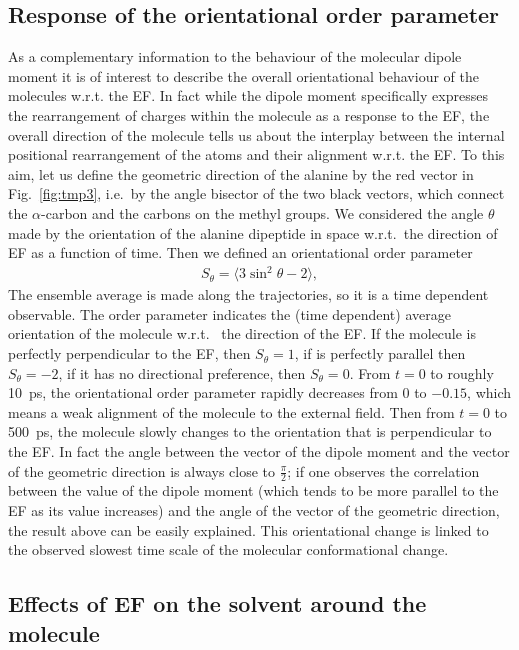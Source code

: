 \documentclass[a4paper,preprint,unsortedaddress,onecolumn]{revtex4-1}
\newcommand{\recheck}[1]{{\color{red} #1}}
\begin{document}
\subsection{Response of the orientational order parameter}
\recheck{As a complementary information to the behaviour of the molecular dipole moment it is of interest to describe the overall orientational behaviour of the molecules w.r.t. the EF. In fact while the dipole moment specifically expresses the rearrangement of charges within the molecule as a response to the EF, the overall direction of the molecule tells us about the interplay between the internal positional rearrangement of the atoms and their alignment w.r.t. the EF.   
To this aim,} let us define
the geometric direction of the alanine by the red vector in
Fig.~\ref{fig:tmp3}, i.e.~by the angle bisector of the two black vectors,
which connect the $\alpha$-carbon and the carbons
on the methyl groups. 
We considered the angle $\theta$ made by 
the orientation of the alanine dipeptide in space w.r.t.~the direction of EF
as a function of time.
Then we defined an orientational order parameter 
\begin{align}
  S_\theta = \langle 3\sin^2\theta - 2\rangle,
\end{align}
\recheck{The ensemble average is made along the trajectories, so it is
a time dependent observable.
The order parameter
indicates the (time dependent) average orientation of the molecule w.r.t. ~the direction of the EF.}
If the molecule is perfectly perpendicular to the EF, then $S_\theta = 1$, if is perfectly parallel then $S_\theta = -2$, if it has no directional
preference, then $S_\theta = 0$. 
From $t=0$ to roughly 10~ps, the orientational order parameter rapidly
decreases from 0 to $-0.15$, which means a weak alignment of the molecule to the external field.
Then from $t=0$ to 500~ps, the molecule slowly changes to the orientation
that is perpendicular to the EF. \recheck{In fact the angle between the vector of the dipole moment and the vector of the geometric direction is always close to $\frac{\pi}{2}$; if one observes the correlation between the value of the dipole moment (which tends to be more parallel to the EF as its value increases) and the angle of the vector of the geometric direction, the result above can be easily explained.}  
This orientational change is linked to the observed slowest
time scale of the molecular conformational change.
 

\subsection{Effects of EF on the solvent around the molecule}
\end{document}

